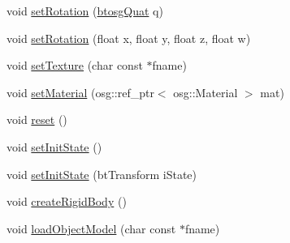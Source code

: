 \begin{DoxyCompactItemize}
void \mbox{\hyperlink{classbtosgObject_a6365748d5506bb9da31907c9988071fa}{set\+Rotation}} (\mbox{\hyperlink{classbtosgQuat}{btosg\+Quat}} q)
\item 
void \mbox{\hyperlink{classbtosgObject_a4d21ca59b944fd26644db35d3e9ba67a}{set\+Rotation}} (float x, float y, float z, float w)
\item 
void \mbox{\hyperlink{classbtosgObject_aff54acbc7c66811efb0cf2838107a241}{set\+Texture}} (char const $\ast$fname)
\item 
void \mbox{\hyperlink{classbtosgObject_a6ab7b9e0553dab398b980637788b56a8}{set\+Material}} (osg\+::ref\+\_\+ptr$<$ osg\+::\+Material $>$ mat)
\item 
void \mbox{\hyperlink{classbtosgObject_a93983f9180dd0672f8779cf2baa78580}{reset}} ()
\item 
void \mbox{\hyperlink{classbtosgObject_ad1508a0ce28cfac83e5f0ff6245f91b5}{set\+Init\+State}} ()
\item 
void \mbox{\hyperlink{classbtosgObject_a6ceb08e59ee95acaaef389ee198d2b56}{set\+Init\+State}} (bt\+Transform i\+State)
\item 
void \mbox{\hyperlink{classbtosgObject_a029dbe9134fa94e7355799f67fb2cd6d}{create\+Rigid\+Body}} ()
\item 
void \mbox{\hyperlink{classbtosgObject_a91838b8235579da178fcc06e6d3d47f3}{load\+Object\+Model}} (char const $\ast$fname)
\end{DoxyCompactItemize}
